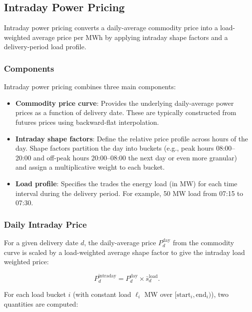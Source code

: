 \subsection{Intraday Power Pricing}
\label{ss:intraday_power_pricing}

Intraday power pricing converts a daily-average commodity price into a load-weighted average price per MWh by applying intraday shape factors and a delivery-period load profile.

\subsubsection{Components}

Intraday power pricing combines three main components:

\begin{itemize}
\item \textbf{Commodity price curve}: Provides the underlying daily-average power prices as a function of delivery date. These are typically constructed from futures prices using backward-flat interpolation.

\item \textbf{Intraday shape factors}: Define the relative price profile across hours of the day. Shape factors partition the day into buckets (e.g., peak hours 08:00--20:00 and off-peak hours 20:00--08:00 the next day or even more granular) and assign a multiplicative weight to each bucket.

\item \textbf{Load profile}: Specifies the trades the energy load (in MW) for each time interval during the delivery period. For example, 50 MW load from 07:15 to 07:30.
\end{itemize}

\subsubsection{Daily Intraday Price}

For a given delivery date $d$, the daily-average price $P_d^{\mathrm{day}}$ from the commodity curve is scaled by a load-weighted average shape factor to give the intraday load weighted price:

$$
P_d^{\mathrm{intraday}} = P_d^{\mathrm{day}} \times \bar{s}_d^{\mathrm{load}}.
$$

For each load bucket $i$ (with constant load $\ell_i$ MW over $[\mathrm{start}_i, \mathrm{end}_i)$), two quantities are computed:


